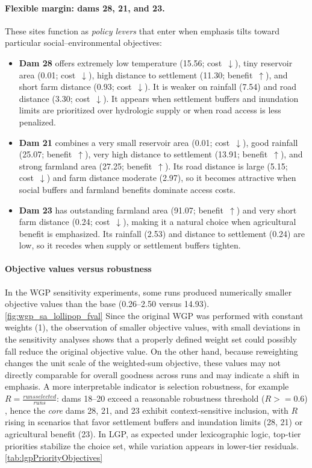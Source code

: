 \paragraph{Flexible margin: dams 28, 21, and 23.}
These sites function as \textit{policy levers} that enter when emphasis tilts toward particular social--environmental objectives:
\begin{itemize}
\item \textbf{Dam 28} offers extremely low temperature (15.56; cost~$\downarrow$), tiny reservoir area (0.01; cost~$\downarrow$), high distance to settlement (11.30; benefit~$\uparrow$), and short farm distance (0.93; cost~$\downarrow$). It is weaker on rainfall (7.54) and road distance (3.30; cost~$\downarrow$). It appears when settlement buffers and inundation limits are prioritized over hydrologic supply or when road access is less penalized.
\item \textbf{Dam 21} combines a very small reservoir area (0.01; cost~$\downarrow$), good rainfall (25.07; benefit~$\uparrow$), very high distance to settlement (13.91; benefit~$\uparrow$), and strong farmland area (27.25; benefit~$\uparrow$). Its road distance is large (5.15; cost~$\downarrow$) and farm distance moderate (2.97), so it becomes attractive when social buffers and farmland benefits dominate access costs.
\item \textbf{Dam 23} has outstanding farmland area (91.07; benefit~$\uparrow$) and very short farm distance (0.24; cost~$\downarrow$), making it a natural choice when agricultural benefit is emphasized. Its rainfall (2.53) and distance to settlement (0.24) are low, so it recedes when supply or settlement buffers tighten.
\end{itemize}

\paragraph{Objective values versus robustness}
In the WGP sensitivity experiments, some runs produced numerically smaller objective values than the base (0.26--2.50 versus 14.93). \ref{fig:wgp_sa_lollipop_fval} Since the original WGP was performed with constant weights (1), the observation of smaller objective values, with small deviations in the sensitivity analyses shows that a properly defined weight set could possibly fall reduce the original objective value. On the other hand, because reweighting changes the unit scale of the weighted-sum objective, these values may not directly comparable for overall goodness across runs and may indicate a shift in emphasis. A more interpretable indicator is selection robustness, for example $R = \frac{runs selected}{runs}$: dams 18--20 exceed a reasonable robustness threshold ($R >= 0.6$) , hence the \textit{core} dams 28, 21, and 23 exhibit context-sensitive inclusion, with $R$ rising in scenarios that favor settlement buffers and inundation limits (28, 21) or agricultural benefit (23). In LGP, as expected under lexicographic logic, top-tier priorities stabilize the choice set, while variation appears in lower-tier residuals. \ref{tab:lgpPriorityObjectives}

